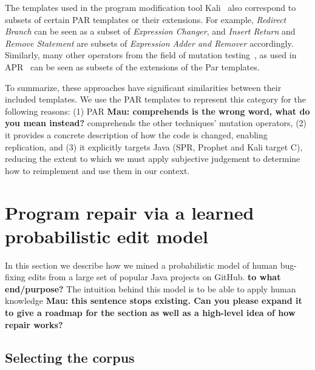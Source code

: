 \documentclass[conference]{IEEEtran}
\newcommand{\todo}[1]
  {{\scriptsize \textbf{\color{red} {#1}}}}
\begin{document}
The templates used in the program modification tool Kali~\cite{Qi15}
also correspond to subsets of certain PAR templates or their extensions. 
For example, \emph{Redirect Branch} can be seen as
a subset of \emph{Expression Changer}, and \emph{Insert Return} and \emph{Remove Statement} are
subsets of \emph{Expression Adder and Remover} accordingly. Similarly,
many other operators from the field of mutation testing~\cite{Offutt06}, as used in
APR~\cite{debroy10,xuan16} can be seen as subsets of the extensions of the 
Par templates.  

To summarize, these approaches have significant similarities between their
included templates.  We use the PAR templates to represent this category
for the following reasons: (1) PAR \todo{Mau: comprehends is the wrong word, what do you mean
  instead?} comprehends the other techniques' mutation operators, (2) it
provides a concrete description of how the code is changed, enabling
replication, and (3) it explicitly targets Java (SPR, Prophet and Kali
target C), reducing the extent to which we must apply subjective judgement to
determine how to reimplement and use them in our context.

\section{Program repair via a learned probabilistic edit model} \label{buildingTheModel}

In this section we describe how we mined a probabilistic
model of human bug-fixing edits from a large set of popular Java projects on
GitHub.\todo{to what end/purpose?} The intuition behind this model is to be able to apply human
knowledge\todo{Mau: this sentence stops existing. Can you please expand it to
  give a roadmap for the section as well as a high-level idea of how repair works?}

\subsection{Selecting the corpus}
\end{document}
